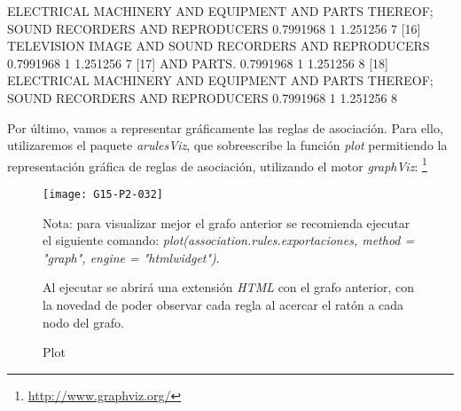 \documentclass [a4paper] {article}
\begin{document}
{\begin{Schunk}
\begin{Soutput}
[15] {ELECTRICAL MACHINERY AND EQUIPMENT AND PARTS THEREOF; SOUND RECORDERS AND REPRODUCERS} 0.7991968 1          1.251256 7      
[16] {TELEVISION IMAGE AND SOUND RECORDERS AND REPRODUCERS}                                  0.7991968 1          1.251256 7      
[17] {AND PARTS.}                                                                            0.7991968 1          1.251256 8      
[18] {ELECTRICAL MACHINERY AND EQUIPMENT AND PARTS THEREOF; SOUND RECORDERS AND REPRODUCERS} 0.7991968 1          1.251256 8      
\end{Soutput}
\end{Schunk}
}

Por último, vamos a representar gráficamente las reglas de asociación. Para ello, utilizaremos el paquete \textit{arulesViz}, que sobreescribe la función \textit{plot} permitiendo la representación gráfica de reglas
de asociación, utilizando el motor \textit{graphViz}: \footnote{\url{http://www.graphviz.org/}}

\begin{figure}[h!]
\centering
\texttt{[image: G15-P2-032]}
\caption{Plot}
Nota: para visualizar mejor el grafo anterior se recomienda ejecutar el siguiente comando:
\hfil \textit{plot(association.rules.exportaciones, method = "graph", engine = "htmlwidget")}. \par

Al ejecutar se abrirá una extensión \textit{HTML} con el grafo anterior, con la novedad de poder observar cada regla al acercar el ratón a cada nodo del grafo.
\end{figure}
\end{document}
